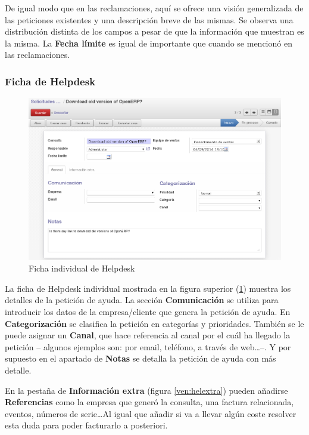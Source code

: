 De igual modo que en las reclamaciones, aquí se ofrece una visión generalizada de las peticiones existentes y una descripción breve
de las mismas. Se observa una distribución distinta de los campos a pesar de que la información que muestran es la misma. La \textbf{Fecha límite} es igual de importante que cuando se mencionó en las reclamaciones.

\subsubsection{Ficha de Helpdesk}

\begin{figure}[H]
\includegraphics[width=\textwidth]{ventas/img/ven_helindividual.png}
\caption{Ficha individual de Helpdesk}
\label{ven:helindividual}
\end{figure}

La ficha de Helpdesk individual mostrada en la figura superior (\ref{ven:helindividual}) muestra los detalles de la petición de ayuda.
La sección \textbf{Comunicación} se utiliza para introducir los datos de la empresa/cliente que genera la petición de ayuda. En \textbf{Categorización} se clasifica la petición en categorías y prioridades. También se le puede asignar un \textbf{Canal}, que hace referencia
al canal por el cuál ha llegado la petición -- algunos ejemplos son: por email, teléfono, a través de web\ldots --. Y por supuesto en el apartado de \textbf{Notas} se detalla la petición de ayuda con más detalle.

En la pestaña de \textbf{Información extra} (figura \ref{ven:helextra}) pueden añadirse \textbf{Referencias} como la empresa que generó la consulta, una factura relacionada, eventos, números de serie\ldots Al igual que añadir si va a llevar algún coste resolver esta duda para poder facturarlo a posteriori.


